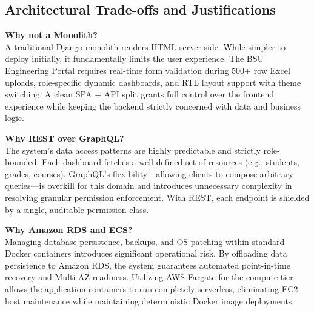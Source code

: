 \subsection{Architectural Trade-offs and Justifications}

\textbf{Why not a Monolith?} \\
A traditional Django monolith renders HTML server-side. While simpler to deploy initially, it fundamentally limits the user experience. The BSU Engineering Portal requires real-time form validation during 500+ row Excel uploads, role-specific dynamic dashboards, and RTL layout support with theme switching. A clean SPA + API split grants full control over the frontend experience while keeping the backend strictly concerned with data and business logic.

\textbf{Why REST over GraphQL?} \\
The system's data access patterns are highly predictable and strictly role-bounded. Each dashboard fetches a well-defined set of resources (e.g., students, grades, courses). GraphQL's flexibility---allowing clients to compose arbitrary queries---is overkill for this domain and introduces unnecessary complexity in resolving granular permission enforcement. With REST, each endpoint is shielded by a single, auditable permission class.

\textbf{Why Amazon RDS and ECS?} \\
Managing database persistence, backups, and OS patching within standard Docker containers introduces significant operational risk. By offloading data persistence to Amazon RDS, the system guarantees automated point-in-time recovery and Multi-AZ readiness. Utilizing AWS Fargate for the compute tier allows the application containers to run completely serverless, eliminating EC2 host maintenance while maintaining deterministic Docker image deployments.

